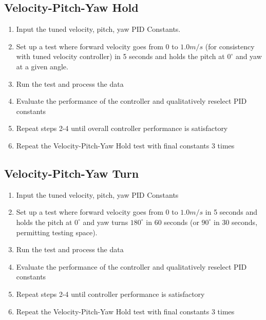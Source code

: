 \documentclass{article}
\begin{document}
\subsection*{Velocity-Pitch-Yaw Hold}
\begin{enumerate}
\item Input the tuned velocity, pitch, yaw PID Constants.
\item Set up a test where forward velocity goes from 0 to $1.0 m/s$ (for consistency with tuned velocity controller) in 5 seconds and holds the pitch at $0^\circ$ and yaw at a given angle.
\item Run the test and process the data
\item Evaluate the performance of the controller and qualitatively reselect PID constants
\item Repeat steps 2-4 until overall controller performance is satisfactory
\item Repeat the Velocity-Pitch-Yaw Hold test with final constants 3 times
\end{enumerate}

\subsection*{Velocity-Pitch-Yaw Turn}
\begin{enumerate}
\item Input the tuned velocity, pitch, yaw PID Constants
\item Set up a test where forward velocity goes from  0 to $1.0 m/s$ in 5 seconds and holds the pitch at $0^\circ$ and yaw turns $180^\circ$ in 60 seconds (or $90^\circ$ in 30 seconds, permitting testing space).
\item Run the test and process the data
\item Evaluate the performance of the controller and qualitatively reselect PID constants
\item Repeat steps 2-4 until controller performance is satisfactory
\item Repeat the Velocity-Pitch-Yaw Hold test with final constants 3 times
\end{enumerate}
\end{document}
